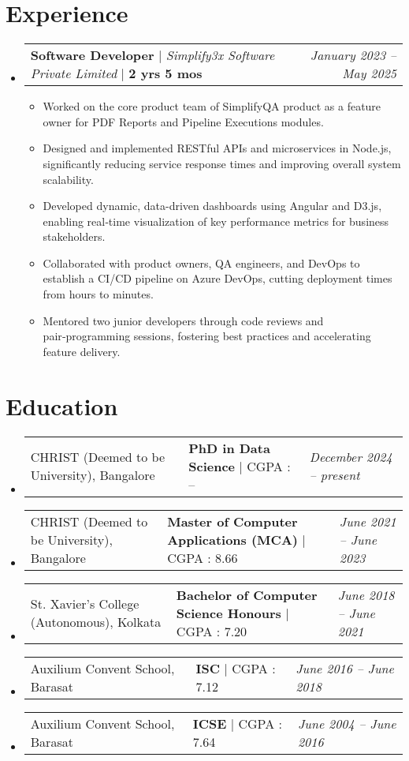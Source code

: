 \documentclass[letterpaper,10pt]{article}
\makeatletter
\newcommand{\subheadingtitlevspace}{\vspace{-3pt}}
\newcommand{\resumeItem}[1]{\item{#1 \vspace{-4pt}}}
\newcommand{\titleItem}[1]{\textbf{#1}}
\newcommand{\resumeSubheading}[4]{
  \item
    \begin{tabular*}{0.97\textwidth}[t]{l@{\extracolsep{\fill}}l@{}l}     
      {#1} & \titleItem{#3} | {#2} & \textit{#4}\\
    \end{tabular*}\vspace{-10pt}
}
\newcommand{\resumeProjectHeading}[2]{
    \item
    \begin{tabular*}{0.97\textwidth}{l@{\extracolsep{\fill}}r}
        #1 & \textit{ #2} \\
    \end{tabular*}\vspace{-9pt}
}
\newcommand{\resumeSubHeadingListStart}{\subheadingtitlevspace\begin{itemize}[leftmargin=0.15in, label={}]}
\newcommand{\resumeSubHeadingListEnd}{\end{itemize}}
\newcommand{\resumeItemListStart}{\begin{itemize}}
\newcommand{\resumeItemListEnd}{\end{itemize}\vspace{-8pt}}
\makeatother
\begin{document}
\section{Experience}

\resumeSubHeadingListStart
\resumeProjectHeading{\titleItem{Software Developer} $|$ \emph{Simplify3x Software Private Limited} $|$ \textbf{2 yrs 5 mos}}{January 2023 -- May 2025} 
    \resumeItemListStart
        \resumeItem{Worked on the core product team of SimplifyQA product as a feature owner for PDF Reports and Pipeline Executions modules.}
        \resumeItem{Designed and implemented RESTful APIs and microservices in Node.js, significantly reducing service response times and improving overall system scalability.}
        \resumeItem{Developed dynamic, data-driven dashboards using Angular and D3.js, enabling real‑time visualization of key performance metrics for business stakeholders.}
        \resumeItem{Collaborated with product owners, QA engineers, and DevOps to establish a CI/CD pipeline on Azure DevOps, cutting deployment times from hours to minutes.}
        \resumeItem{Mentored two junior developers through code reviews and pair‑programming sessions, fostering best practices and accelerating feature delivery.}
    \resumeItemListEnd
\resumeSubHeadingListEnd


\section{Education}
\resumeSubHeadingListStart
    \resumeSubheading{CHRIST (Deemed to be University), Bangalore}{CGPA : --}{PhD in Data Science}{December 2024 -- present}
    \vspace{0.5em}
    \resumeSubheading{CHRIST (Deemed to be University), Bangalore}{CGPA : 8.66}{Master of Computer Applications (MCA)}{June 2021 -- June 2023}
    \vspace{0.5em}
    \resumeSubheading{St. Xavier's College (Autonomous), Kolkata}{CGPA : 7.20}{Bachelor of Computer Science Honours}{June 2018 -- June 2021}
    \vspace{0.5em}
    \resumeSubheading{Auxilium Convent School, Barasat}{CGPA : 7.12}{ISC}{June 2016 -- June 2018} 
    \vspace{0.5em}
    \resumeSubheading{Auxilium Convent School, Barasat}{CGPA : 7.64}{ICSE}{June 2004 -- June 2016}
\resumeSubHeadingListEnd
\vspace{-8pt}



% 
% 
\end{document}
